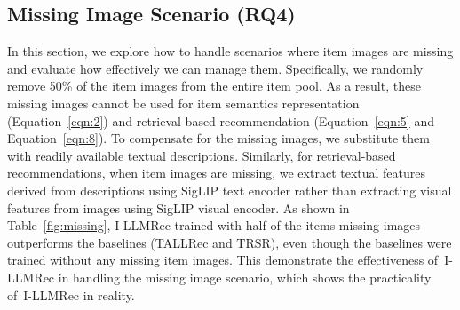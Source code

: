 \documentclass[sigconf]{acmart}
\newcommand{\proposed}{\textsf{I-LLMRec}}
\begin{document}
\subsection{Missing Image Scenario (RQ4)}
\label{app_sec:missing_image}
In this section, we explore how to handle scenarios where item images are missing and evaluate how effectively we can manage them. Specifically, we randomly remove 50\% of the item images from the entire item pool. As a result, these missing images cannot be used for item semantics representation (Equation~\ref{eqn:2}) and retrieval-based recommendation (Equation~\ref{eqn:5} and Equation~\ref{eqn:8}). To compensate for the missing images, we substitute them with readily available textual descriptions. 
Similarly, for retrieval-based recommendations, when item images are missing, we extract textual features derived from descriptions using SigLIP \cite{zhai2023sigmoid} text encoder rather than extracting visual features from images using SigLIP visual encoder. 
As shown in Table~\ref{fig:missing}, \proposed{} trained with half of the items missing images outperforms the baselines (TALLRec and TRSR), even though the baselines were trained without any missing item images. This demonstrate the effectiveness of~\proposed{} in handling the missing image scenario, which shows the practicality of~\proposed{} in reality.
\end{document}
